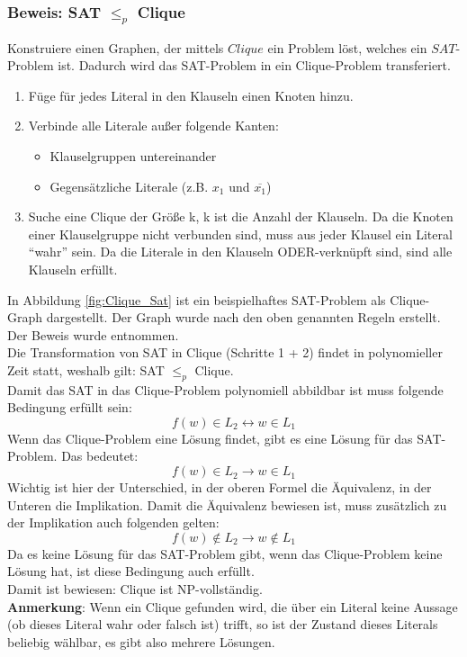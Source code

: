 \documentclass[ngerman]{article}
\begin{document}
\subsubsection{Beweis: SAT $\le_p$ Clique}
\label{sec:SAT_Clique}
Konstruiere einen Graphen, der mittels \(Clique\) ein Problem löst, welches ein \(SAT\)-Problem ist.
Dadurch wird das SAT-Problem in ein Clique-Problem transferiert.
\begin{enumerate}
\item Füge für jedes Literal in den Klauseln einen Knoten hinzu.
\item Verbinde alle Literale außer folgende Kanten:
\begin{itemize}
\item Klauselgruppen untereinander
\item Gegensätzliche Literale (z.B. \(x_1\) und \(\overline{x_1}\))
\end{itemize}
\item Suche eine Clique der Größe k, k ist die Anzahl der Klauseln.
Da die Knoten einer Klauselgruppe nicht verbunden sind, muss aus jeder Klausel ein Literal ``wahr'' sein.
Da die Literale in den Klauseln ODER-verknüpft sind, sind alle Klauseln erfüllt.\\
\end{enumerate}
In Abbildung \vref{fig:Clique_Sat} ist ein beispielhaftes SAT-Problem als Clique-Graph dargestellt.
Der Graph wurde nach den oben genannten Regeln erstellt.
Der Beweis wurde \cite{weitz} entnommen.\\
Die Transformation von SAT in Clique (Schritte 1 + 2) findet in polynomieller Zeit statt, weshalb gilt: SAT $\le_p$ Clique.\\
Damit das SAT in das Clique-Problem polynomiell abbildbar ist muss folgende Bedingung erfüllt sein:
$$f(w) \in L_2 \leftrightarrow w \in L_1$$
Wenn das Clique-Problem eine Lösung findet, gibt es eine Lösung für das SAT-Problem. Das bedeutet:
$$f(w) \in L_2 \rightarrow w \in L_1$$
Wichtig ist hier der Unterschied, in der oberen Formel die Äquivalenz, in der Unteren die Implikation. Damit die Äquivalenz bewiesen ist, muss zusätzlich zu der Implikation auch folgenden gelten:
$$f(w) \notin L_2 \rightarrow w \notin L_1$$
Da es keine Lösung für das SAT-Problem gibt, wenn das Clique-Problem keine Lösung hat, ist diese Bedingung auch erfüllt.\\
Damit ist bewiesen: Clique ist NP-vollständig.\\
\textbf{Anmerkung}:
Wenn ein Clique gefunden wird, die über ein Literal keine Aussage (ob dieses Literal wahr oder falsch ist) trifft, so ist der Zustand dieses Literals beliebig wählbar, es gibt also mehrere Lösungen.
\end{document}
